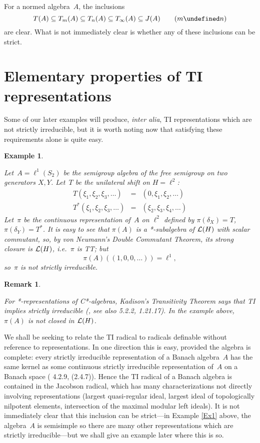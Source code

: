 \documentclass[11pt]{article}
\newcommand{\ie}{i.e.\ }
\newcommand{\sseq}{\subseteq}
\let\leq\undefined  \let\geq\undefined
\let\le\leq   \let\ge\geq
\newtheorem{example}[thm]{Example}
\newtheorem{remk}[thm]{Remark}
\newenvironment{Example}{\begin{example}\begin{rm}}{\end{rm}\end{example}}
\newenvironment{Remark}{\begin{remk}\begin{rm}}{\end{rm}\end{remk}}
\newcommand{\LH}{{\cal L}(H)}
\begin{document}
For a normed algebra~$A$, the inclusions
$$T(A) \sseq T_m(A) \sseq T_n(A) \sseq T_\infty(A) \sseq J(A) \qquad (m \le n)$$
are clear.   What is not immediately clear is whether any of these inclusions
can be strict.

\section{Elementary properties of TI representations}\label{S3}

Some of our later examples will produce, {\em inter alia}, TI representations
which are not strictly irreducible, but it is worth noting now that
satisfying these requirements alone is quite easy.

\begin{Example}\label{Ex1}
Let~$A= \ell^1(S_2)$ be the semigroup algebra of the free semigroup on two
generators $X,Y$.    Let~$T$ be the unilateral shift on $H=\ell^2$:
\begin{eqnarray*}
T(\xi_1,\xi_2,\xi_3,\dots) & = & (0,\xi_1,\xi_2,\dots)\\
T^*(\xi_1,\xi_2,\xi_3,\dots) & = & (\xi_2,\xi_3,\xi_4,\dots)
\end{eqnarray*}
Let~$\pi$ be the continuous representation of~$A$ on $\ell^2$ defined by
$\pi(\delta_X) = T$, $\pi(\delta_Y) = T^*$.   It is easy to see that
$\pi(A)$ is a *-subalgebra of $\LH$ with scalar commutant, so, by von Neumann's
Double Commutant Theorem, its strong closure is $\LH$, \ie $\pi$ is TT; but
$$\pi(A)((1,0,0,\dots))  = \ell^1,$$ so~$\pi$ is not strictly irreducible.
\end{Example}

\begin{Remark}
For *-representations of C*-algebras,
Kadison's Transitivity Theorem says that TI implies strictly irreducible
(\cite{Kadison}, see also \cite{Murphy} 5.2.2, \cite{Sakai} 1.21.17).  In
the example above, $\pi(A)$ is not closed in $\LH$.
\end{Remark}

We shall be seeking to relate the TI radical to radicals definable without
reference to representations.    In one direction this is easy, provided the
algebra is complete:  every strictly irreducible representation of a Banach algebra~$A$ has the
same kernel as some continuous strictly irreducible representation of~$A$ on a Banach
space (\cite{Palmerbk} 4.2.9, \cite{Rickart} (2.4.7)).    Hence the TI radical
of a Banach algebra is contained in the Jacobson radical, which has many
characterizations not directly involving representations (largest quasi-regular
ideal, largest ideal of topologically nilpotent elements, intersection of the
maximal modular left ideals).   It is not immediately clear
that this inclusion can be strict---in Example \ref{Ex1} above, the algebra~$A$
is semisimple so there are many other representations which are strictly
irreducible---but we shall give an example later where this is so.
\end{document}

